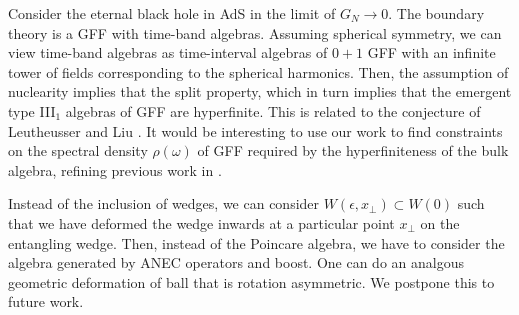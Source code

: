 \documentclass[a4paper,11pt]{article}
\theoremstyle{definition}
\newcommand{\ep}{\epsilon}
\newcommand{\p}{\partial}
\begin{document}


Consider the eternal black hole in AdS in the limit of $G_N\to 0$. The boundary theory is a GFF with time-band algebras. Assuming spherical symmetry, we can view time-band algebras as time-interval algebras of $0+1$ GFF with an infinite tower of fields corresponding to the spherical harmonics. Then, the assumption of nuclearity implies that the split property, which in turn implies that the emergent type III$_1$ algebras of GFF are hyperfinite. This is related to the conjecture of Leutheusser and Liu \cite{leutheusser2023emergent}. It would be interesting to use our work to find constraints on the spectral density $\rho(\omega)$ of GFF required by the hyperfiniteness of the bulk algebra, refining previous work in \cite{furuya2023information}.






Instead of the inclusion of wedges, we can consider $W(\ep,x_\perp)\subset W(0)$ such that we have deformed the wedge inwards at a particular point $x_\perp$ on the entangling wedge. Then, instead of the Poincare algebra, we have to consider the algebra generated by ANEC operators and boost. One can do an analgous geometric deformation of ball that is rotation asymmetric. We postpone this to future work.
\end{document}
